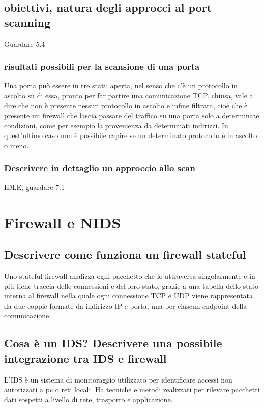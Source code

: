 \documentclass{report}
\begin{document}
\section{obiettivi, natura degli approcci al port scanning}
Guardare 5.4
\subsection{risultati possibili per la scansione di una porta}
Una porta può essere in tre stati: aperta, nel senso che c'è un protocollo in ascolto su di essa, pronto per far partire una comunicazione TCP.
chiusa, vale a dire che non è presente nessun protocollo in ascolto e infine filtrata, cioè che è presente un firewall che lascia passare del traffico
su una porta solo a determinate condizioni, come per esempio la provenienza da determinati indirizzi.
In quest'ultimo caso non è possibile capire se un determinato protocollo è in ascolto o meno.

\subsection{Descrivere in dettaglio un approccio allo scan}
IDLE, guardare 7.1




\chapter{Firewall e NIDS}
\section{Descrivere come funziona un firewall stateful}
Uno stateful firewall analizza ogni pacchetto che lo attraversa singolarmente e in più tiene traccia delle connessioni e del loro stato, grazie 
a una tabella dello stato interna al firewall nella quale ogni connessione TCP e UDP viene rappresentata da due coppie formate da indirizzo IP e porta, 
una per ciascun endpoint della comunicazione.

\section{Cosa è un IDS? Descrivere una possibile integrazione tra IDS e firewall}
L'IDS è un sistema di monitoraggio utilizzato per identificare accessi non autorizzati a pc o reti locali. Ha tecniche e metodi realizzati per rilevare pacchetti 
dati sospetti a livello di rete, trasporto e applicazione. 
\end{document}
